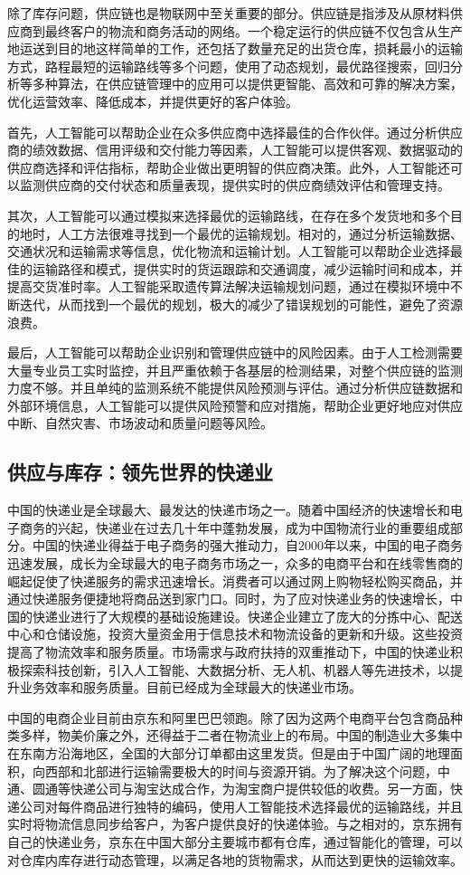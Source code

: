 除了库存问题，供应链也是物联网中至关重要的部分。供应链是指涉及从原材料供应商到最终客户的物流和商务活动的网络。一个稳定运行的供应链不仅包含从生产地运送到目的地这样简单的工作，还包括了数量充足的出货仓库，损耗最小的运输方式，路程最短的运输路线等多个问题，使用了动态规划，最优路径搜索，回归分析等多种算法，在供应链管理中的应用可以提供更智能、高效和可靠的解决方案，优化运营效率、降低成本，并提供更好的客户体验。

首先，人工智能可以帮助企业在众多供应商中选择最佳的合作伙伴。通过分析供应商的绩效数据、信用评级和交付能力等因素，人工智能可以提供客观、数据驱动的供应商选择和评估指标，帮助企业做出更明智的供应商决策。此外，人工智能还可以监测供应商的交付状态和质量表现，提供实时的供应商绩效评估和管理支持。

其次，人工智能可以通过模拟来选择最优的运输路线，在存在多个发货地和多个目的地时，人工方法很难寻找到一个最优的运输规划。相对的，通过分析运输数据、交通状况和运输需求等信息，优化物流和运输计划。人工智能可以帮助企业选择最佳的运输路径和模式，提供实时的货运跟踪和交通调度，减少运输时间和成本，并提高交货准时率。人工智能采取遗传算法解决运输规划问题，通过在模拟环境中不断迭代，从而找到一个最优的规划，极大的减少了错误规划的可能性，避免了资源浪费。

最后，人工智能可以帮助企业识别和管理供应链中的风险因素。由于人工检测需要大量专业员工实时监控，并且严重依赖于各基层的检测结果，对整个供应链的监测力度不够。并且单纯的监测系统不能提供风险预测与评估。通过分析供应链数据和外部环境信息，人工智能可以提供风险预警和应对措施，帮助企业更好地应对供应中断、自然灾害、市场波动和质量问题等风险。

\subsection{供应与库存：领先世界的快递业}
中国的快递业是全球最大、最发达的快递市场之一。随着中国经济的快速增长和电子商务的兴起，快递业在过去几十年中蓬勃发展，成为中国物流行业的重要组成部分。中国的快递业得益于电子商务的强大推动力，自2000年以来，中国的电子商务迅速发展，成长为全球最大的电子商务市场之一，众多的电商平台和在线零售商的崛起促使了快递服务的需求迅速增长。消费者可以通过网上购物轻松购买商品，并通过快递服务便捷地将商品送到家门口。同时，为了应对快递业务的快速增长，中国的快递业进行了大规模的基础设施建设。快递企业建立了庞大的分拣中心、配送中心和仓储设施，投资大量资金用于信息技术和物流设备的更新和升级。这些投资提高了物流效率和服务质量。市场需求与政府扶持的双重推动下，中国的快递业积极探索科技创新，引入人工智能、大数据分析、无人机、机器人等先进技术，以提升业务效率和服务质量。目前已经成为全球最大的快递业市场。

中国的电商企业目前由京东和阿里巴巴领跑。除了因为这两个电商平台包含商品种类多样，物美价廉之外，还得益于二者在物流业上的布局。中国的制造业大多集中在东南方沿海地区，全国的大部分订单都由这里发货。但是由于中国广阔的地理面积，向西部和北部进行运输需要极大的时间与资源开销。为了解决这个问题，中通、圆通等快递公司与淘宝达成合作，为淘宝商户提供较低的收费。另一方面，快递公司对每件商品进行独特的编码，使用人工智能技术选择最优的运输路线，并且实时将物流信息同步给客户，为客户提供良好的快递体验。与之相对的，京东拥有自己的快递业务，京东在中国大部分主要城市都有仓库，通过智能化的管理，可以对仓库内库存进行动态管理，以满足各地的货物需求，从而达到更快的运输效率。